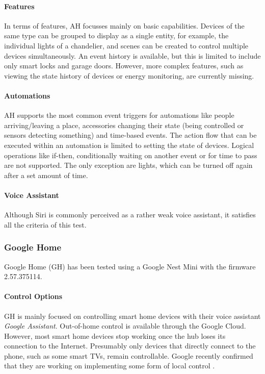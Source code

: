 \paragraph{Features}
In terms of features, AH focusses mainly on basic capabilities. Devices of the same type can be grouped to display as a single entity, for example, the individual lights of a chandelier, and scenes can be created to control multiple devices simultaneously. An event history is available, but this is limited to include only smart locks and garage doors. However, more complex features, such as viewing the state history of devices or energy monitoring, are currently missing.

\paragraph{Automations}
AH supports the most common event triggers for automations like people arriving/leaving a place, accessories changing their state (being controlled or sensors detecting something) and time-based events. The action flow that can be executed within an automation is limited to setting the state of devices. Logical operations like if-then, conditionally waiting on another event or for time to pass are not supported. The only exception are lights, which can be turned off again after a set amount of time.

\paragraph{Voice Assistant}
Although Siri is commonly perceived as a rather weak voice assistant, it satisfies all the criteria of this test.

\newpage
\subsubsection{Google Home}
Google Home (GH) has been tested using a Google Nest Mini with the firmware 2.57.375114.

\paragraph{Control Options}
GH is mainly focused on controlling smart home devices with their voice assistant \textit{Google Assistant}.
Out-of-home control is available through the Google Cloud. However, most smart home devices stop working once the hub loses its connection to the Internet. Presumably only devices that directly connect to the phone, such as some smart TVs, remain controllable. Google recently confirmed that they are working on implementing some form of local control \cite{Reddit_r/GoogleHome2023OfflineMode}.

